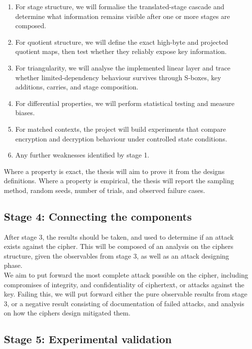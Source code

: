 \documentclass[11pt]{article}
\begin{document}
\begin{enumerate}
\item For stage structure, we will formalise the translated-stage cascade and determine what information remains visible after one or more stages are composed.
\item For quotient structure, we will define the exact high-byte and projected quotient maps, then test whether they reliably expose key information.
\item For triangularity, we will analyse the implemented linear layer and trace whether limited-dependency behaviour survives through S-boxes, key additions, carries, and stage composition.
\item For differential properties, we will perform statistical testing and measure biases.
\item For matched contexts, the project will build experiments that compare encryption and decryption behaviour under controlled state conditions.
\item Any further weaknesses identified by stage 1.
\end{enumerate}

Where a property is exact, the thesis will aim to prove it from the designs definitions. Where a property is empirical, the thesis will report the sampling method, random seeds, number of trials, and observed failure cases.

\subsection{Stage 4: Connecting the components}

After stage 3, the results should be taken, and used to determine if an attack exists against the cipher. This will be composed of an analysis on the ciphers structure, given the observables from stage 3, as well as an attack designing phase.\\

We aim to put forward the most complete attack possible on the cipher, including compromises of integrity, and confidentiality of ciphertext, or attacks against the key. Failing this, we will put forward either the pure observable results from stage 3, or a negative result consisting of documentation of failed attacks, and analysis on how the ciphers design mitigated them.


\subsection{Stage 5: Experimental validation}
\end{document}
